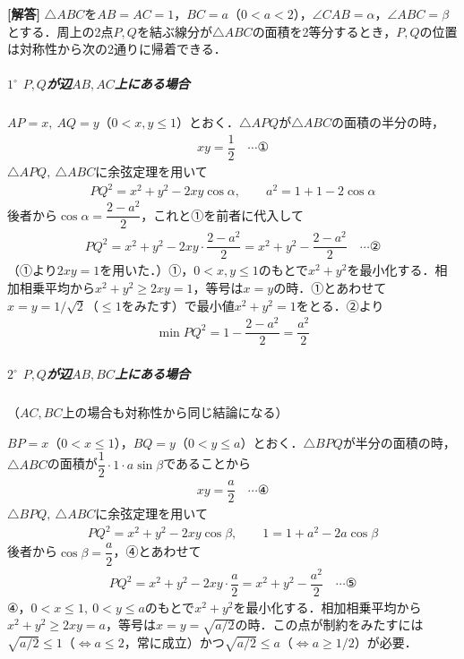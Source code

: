 \documentclass[../../main.tex]{subfiles}
\begin{document}
\begin{oframed}
  
\end{oframed}

{\bf [解答]}
$\triangle ABC$を$AB=AC=1$，$BC=a$（$0<a<2$），$\angle CAB=\alpha$，$\angle ABC=\beta$とする．周上の2点$P,Q$を結ぶ線分が$\triangle ABC$の面積を2等分するとき，$P,Q$の位置は対称性から次の2通りに帰着できる．

\subparagraph{$1^\circ$ $P,Q$が辺$AB,AC$上にある場合}

$AP=x,\ AQ=y$（$0<x,y\le1$）とおく．$\triangle APQ$が$\triangle ABC$の面積の半分の時，
\begin{align}
  xy=\dfrac{1}{2} \quad\cdots\text{①}
\end{align}
$\triangle APQ,\ \triangle ABC$に余弦定理を用いて
\begin{align}
  PQ^2=x^2+y^2-2xy\cos\alpha,\qquad a^2=1+1-2\cos\alpha
\end{align}
後者から$\cos\alpha=\dfrac{2-a^2}{2}$，これと①を前者に代入して
\begin{align}
  PQ^2=x^2+y^2-2xy\cdot\dfrac{2-a^2}{2}=x^2+y^2-\dfrac{2-a^2}{2} \quad\cdots\text{②}
\end{align}
（①より$2xy=1$を用いた．）①，$0<x,y\le1$のもとで$x^2+y^2$を最小化する．相加相乗平均から$x^2+y^2\ge2xy=1$，等号は$x=y$の時．①とあわせて$x=y=1/\sqrt{2}$（$\le1$をみたす）で最小値$x^2+y^2=1$をとる．②より
\begin{align}
  \min PQ^2=1-\dfrac{2-a^2}{2}=\dfrac{a^2}{2}
\end{align}

\subparagraph{$2^\circ$ $P,Q$が辺$AB,BC$上にある場合}（$AC,BC$上の場合も対称性から同じ結論になる）

$BP=x$（$0<x\le1$），$BQ=y$（$0<y\le a$）とおく．$\triangle BPQ$が半分の面積の時，$\triangle ABC$の面積が$\dfrac{1}{2}\cdot1\cdot a\sin\beta$であることから
\begin{align}
  xy=\dfrac{a}{2} \quad\cdots\text{④}
\end{align}
$\triangle BPQ,\ \triangle ABC$に余弦定理を用いて
\begin{align}
  PQ^2=x^2+y^2-2xy\cos\beta,\qquad 1=1+a^2-2a\cos\beta
\end{align}
後者から$\cos\beta=\dfrac{a}{2}$，④とあわせて
\begin{align}
  PQ^2=x^2+y^2-2xy\cdot\dfrac{a}{2}=x^2+y^2-\dfrac{a^2}{2} \quad\cdots\text{⑤}
\end{align}
④，$0<x\le1,\ 0<y\le a$のもとで$x^2+y^2$を最小化する．相加相乗平均から$x^2+y^2\ge2xy=a$，等号は$x=y=\sqrt{a/2}$の時．この点が制約をみたすには$\sqrt{a/2}\le1$（$\iff a\le2$，常に成立）かつ$\sqrt{a/2}\le a$（$\iff a\ge1/2$）が必要．
\end{document}
